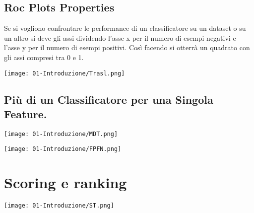 \subsection{Roc Plots Properties}

Se si vogliono confrontare le performance di un classificatore su un dataset o su un altro si deve  gli assi dividendo l'asse x per il numero di esempi negativi e l'asse y per il numero di esempi positivi. Così facendo si otterrà un quadrato con gli assi compresi tra 0 e 1.

\begin{center} 
 \texttt{[image: 01-Introduzione/Trasl.png]}
\end{center}


\subsection{Più di un Classificatore per una Singola Feature.}

\begin{center} 
 \texttt{[image: 01-Introduzione/MDT.png]}
\end{center}


\begin{center} 
 \texttt{[image: 01-Introduzione/FPFN.png]}
\end{center}

\section{Scoring e ranking}



\begin{center} 
 \texttt{[image: 01-Introduzione/ST.png]}
\end{center}

